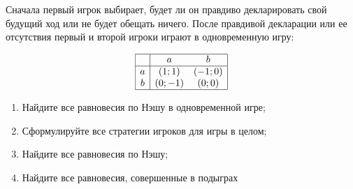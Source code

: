 \begin{problem}[Обещания]
Сначала первый игрок выбирает, будет ли он правдиво декларировать свой будущий ход или не будет обещать ничего. После правдивой декларации или ее отсутствия первый и второй игроки играют в одновременную игру:\par
\[\begin{array}{|c|cc|}  \hline {} & {a} & {b} \\  \hline {a} & {\left(1;1\right)} & {\left(-1;0\right)} \\ {b} & {\left(0;-1\right)} & {\left(0;0\right)} \\  \hline  \end{array}\]
\begin{enumerate}
\item  Найдите все равновесия по Нэшу в одновременной игре;\par
\item Сформулируйте все стратегии игроков для игры в целом;\par
\item  Найдите все равновесия по Нэшу;\par
\item Найдите все равновесия, совершенные в подыграх\par
\end{enumerate}


\begin{sol}

\end{sol}
\end{problem}



